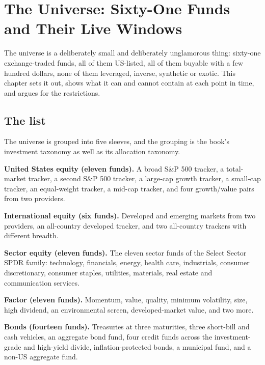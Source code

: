 
\chapter{The Universe: Sixty-One Funds and Their Live Windows}
\label{ch:universe}

The universe is a deliberately small and deliberately unglamorous thing:
sixty-one exchange-traded funds, all of them US-listed, all of them
buyable with a few hundred dollars, none of them leveraged, inverse,
synthetic or exotic. This chapter sets it out, shows what it can and
cannot contain at each point in time, and argues for the restrictions.

\section{The list}

The universe is grouped into five sleeves, and the grouping is the
book's investment taxonomy as well as its allocation taxonomy.

\textbf{United States equity (eleven funds).} A broad S\&P 500 tracker, a
total-market tracker, a second S\&P 500 tracker, a large-cap growth
tracker, a small-cap tracker, an equal-weight tracker, a mid-cap tracker,
and four growth/value pairs from two providers.

\textbf{International equity (six funds).} Developed and emerging markets
from two providers, an all-country developed tracker, and two all-country
trackers with different breadth.

\textbf{Sector equity (eleven funds).} The eleven sector funds of the
Select Sector SPDR family: technology, financials, energy, health care,
industrials, consumer discretionary, consumer staples, utilities,
materials, real estate and communication services.

\textbf{Factor (eleven funds).} Momentum, value, quality, minimum
volatility, size, high dividend, an environmental screen, developed-market
value, and two more.

\textbf{Bonds (fourteen funds).} Treasuries at three maturities, three
short-bill and cash vehicles, an aggregate bond fund, four credit funds
across the investment-grade and high-yield divide, inflation-protected
bonds, a municipal fund, and a non-US aggregate fund.

